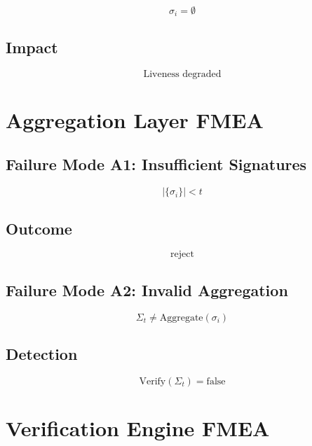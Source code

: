 \begin{equation}
\sigma_i = \emptyset
\end{equation}

\subsection{Impact}

\begin{equation}
\text{Liveness degraded}
\end{equation}

\section{Aggregation Layer FMEA}

\subsection{Failure Mode A1: Insufficient Signatures}

\begin{equation}
|\{\sigma_i\}| < t
\end{equation}

\subsection{Outcome}

\begin{equation}
\text{reject}
\end{equation}

\subsection{Failure Mode A2: Invalid Aggregation}

\begin{equation}
\Sigma_t \neq \text{Aggregate}(\sigma_i)
\end{equation}

\subsection{Detection}

\begin{equation}
\text{Verify}(\Sigma_t) = \text{false}
\end{equation}

\section{Verification Engine FMEA}

